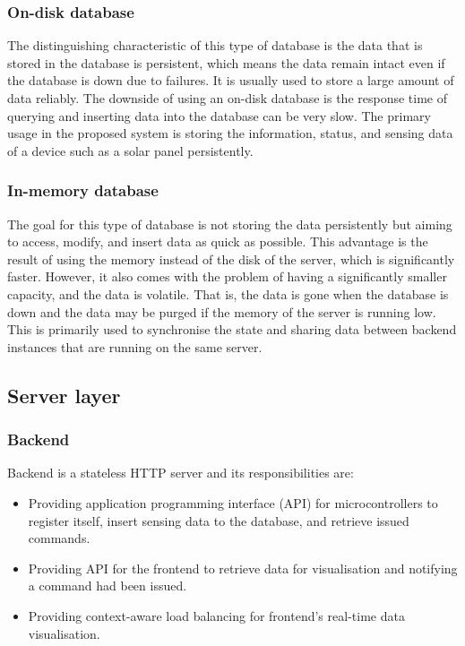 \documentclass[../thesis.tex]{subfiles}
\begin{document}
\subsubsection{On-disk database}

The distinguishing characteristic of this type of database is the data that is stored in the database is persistent, which means the data remain intact even if the database is down due to failures. It is usually used to store a large amount of data reliably. The downside of using an on-disk database is the response time of querying and inserting data into the database can be very slow. The primary usage in the proposed system is storing the information, status, and sensing data of a device such as a solar panel persistently.

\subsubsection{In-memory database}

The goal for this type of database is not storing the data persistently but aiming to access, modify, and insert data as quick as possible. This advantage is the result of using the memory instead of the disk of the server, which is significantly faster. However, it also comes with the problem of having a significantly smaller capacity, and the data is volatile. That is, the data is gone when the database is down and the data may be purged if the memory of the server is running low. This is primarily used to synchronise the state and sharing data between backend instances that are running on the same server.

\subsection{Server layer}

\subsubsection{Backend}

Backend is a stateless HTTP server and its responsibilities are:

\begin{itemize}
\item Providing application programming interface (API) for microcontrollers to register itself, insert sensing data to the database, and retrieve issued commands.
\item Providing API for the frontend to retrieve data for visualisation and notifying a command had been issued.
\item Providing context-aware load balancing for frontend's real-time data visualisation.
\end{itemize}
\end{document}
